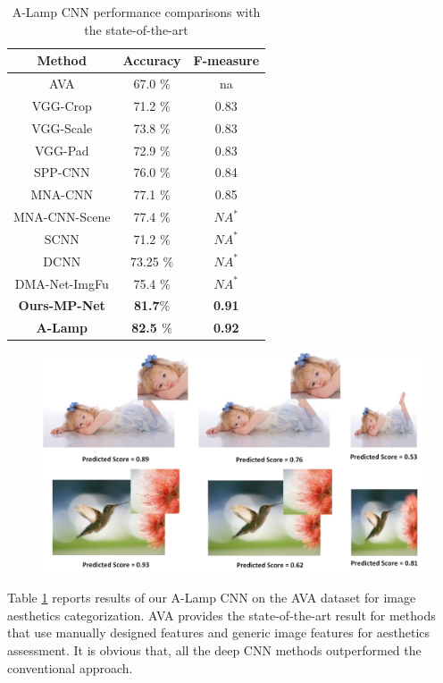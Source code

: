 \documentclass[10pt,twocolumn,letterpaper]{article}
\begin{document}
\begin{table}
	\begin{center}
		\begin{tabular}{||c|c|c||} 
			\hline
			Method & Accuracy & F-measure\\
			\hline\hline
			AVA & 67.0 $\%$ & na  \\
			VGG-Crop & 71.2 $\%$ & 0.83 \\
			VGG-Scale & 73.8 $\%$ & 0.83 \\
			VGG-Pad & 72.9 $\%$ & 0.83 \\
			\hline
			SPP-CNN & 76.0 $\%$ & 0.84 \\
			MNA-CNN & 77.1 $\%$ & 0.85 \\
			MNA-CNN-Scene & 77.4 $\%$ & $N{A^ * }$ \\
			SCNN & 71.2 $\%$ & $N{A^ * }$ \\
			DCNN & 73.25 $\%$ & $N{A^ * }$ \\
			DMA-Net-ImgFu & 75.4 $\%$ & $N{A^ * }$\\
			\hline\hline
			\textbf{Ours-MP-Net} & \textbf{81.7$\% $} & \textbf{0.91} \\
			\textbf{A-Lamp} & \textbf{82.5 $\%$} & \textbf{0.92} \\
			\hline
		\end{tabular} \label{tabel2}
	\end{center}
\caption{A-Lamp CNN performance comparisons with the state-of-the-art}
\end{table}


\begin{figure}
	\centering
	\includegraphics[scale=0.18]{figures/expr_transform.jpg}
	\label{trans_img}
\end{figure}

Table \ref{tabel2} reports results of our A-Lamp CNN on the AVA dataset for image aesthetics categorization. AVA \cite{Murray:MMP2012:AVA} provides the state-of-the-art result for methods that use manually designed features and generic image features for aesthetics assessment. It is obvious that, all the deep CNN methods outperformed the conventional approach.
\end{document}
